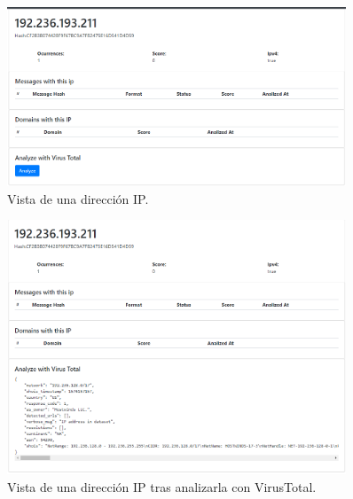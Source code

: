 \begin{figure}[htb]
    \centering
    \includegraphics[width=0.9\textwidth]{imagenes/capturasAplicacion/IP.png}
\caption{Vista de una dirección IP.}
\label{fig:ip}
\end{figure}


\begin{figure}[htb]
    \centering
    \includegraphics[width=0.9\textwidth]{imagenes/capturasAplicacion/IP_vt.png}
\caption{Vista de una dirección IP tras analizarla con VirusTotal.}
\label{fig:ip_vt}
\end{figure}